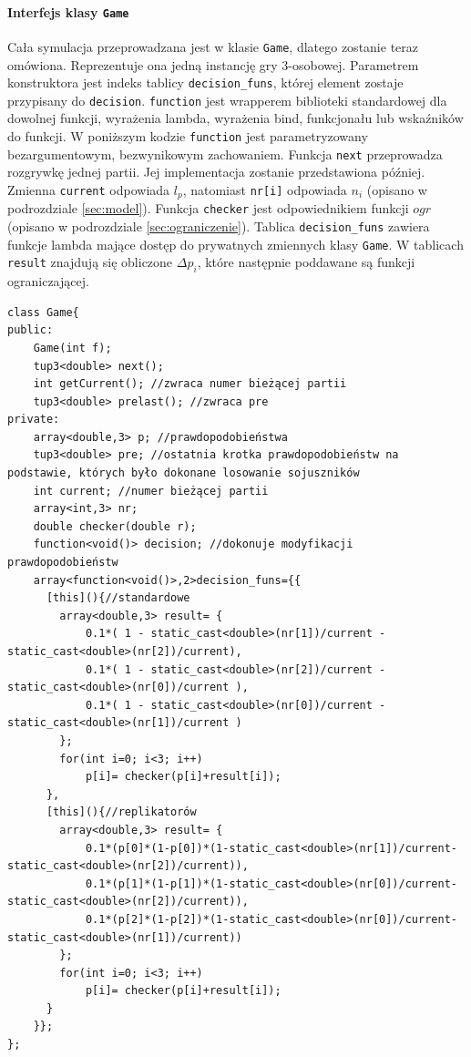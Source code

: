 \paragraph{Interfejs klasy \texttt{Game}}
Cała symulacja przeprowadzana jest w klasie \texttt{Game}, dlatego zostanie teraz omówiona. Reprezentuje ona jedną instancję gry 3-osobowej. Parametrem konstruktora jest indeks tablicy \texttt{decision\_funs}, której element zostaje przypisany do \texttt{decision}. \texttt{function} jest wrapperem biblioteki standardowej dla dowolnej funkcji, wyrażenia lambda, wyrażenia bind, funkcjonału lub wskaźników do funkcji. W poniższym kodzie \texttt{function} jest parametryzowany bezargumentowym, bezwynikowym zachowaniem. Funkcja \texttt{next} przeprowadza rozgrywkę jednej partii. Jej implementacja zostanie przedstawiona później. Zmienna \texttt{current} odpowiada $l_p$, natomiast \texttt{nr[i]} odpowiada $n_i$ (opisano w podrozdziale \ref{sec:model}). Funkcja \texttt{checker} jest odpowiednikiem funkcji $ogr$ (opisano w podrozdziale \ref{sec:ograniczenie}). Tablica \texttt{decision\_funs} zawiera funkcje lambda mające dostęp do prywatnych zmiennych klasy \texttt{Game}. W tablicach \texttt{result} znajdują się obliczone $\Delta p_i$, które następnie poddawane są funkcji ograniczającej. 

\begin{lstlisting}
class Game{
public:
    Game(int f);
    tup3<double> next();
    int getCurrent(); //zwraca numer bieżącej partii
    tup3<double> prelast(); //zwraca pre
private:
    array<double,3> p; //prawdopodobieństwa
    tup3<double> pre; //ostatnia krotka prawdopodobieństw na podstawie, których było dokonane losowanie sojuszników
    int current; //numer bieżącej partii
    array<int,3> nr;
    double checker(double r);
    function<void()> decision; //dokonuje modyfikacji prawdopodobieństw
    array<function<void()>,2>decision_funs={{
      [this](){//standardowe
        array<double,3> result= {
            0.1*( 1 - static_cast<double>(nr[1])/current - static_cast<double>(nr[2])/current),
            0.1*( 1 - static_cast<double>(nr[2])/current - static_cast<double>(nr[0])/current ),
            0.1*( 1 - static_cast<double>(nr[0])/current - static_cast<double>(nr[1])/current )
        };
        for(int i=0; i<3; i++)
            p[i]= checker(p[i]+result[i]);
      },
      [this](){//replikatorów
        array<double,3> result= {
            0.1*(p[0]*(1-p[0])*(1-static_cast<double>(nr[1])/current-static_cast<double>(nr[2])/current)),
            0.1*(p[1]*(1-p[1])*(1-static_cast<double>(nr[0])/current-static_cast<double>(nr[2])/current)),
            0.1*(p[2]*(1-p[2])*(1-static_cast<double>(nr[0])/current-static_cast<double>(nr[1])/current))
        };
        for(int i=0; i<3; i++)
            p[i]= checker(p[i]+result[i]);
      }
    }};
};
\end{lstlisting}

